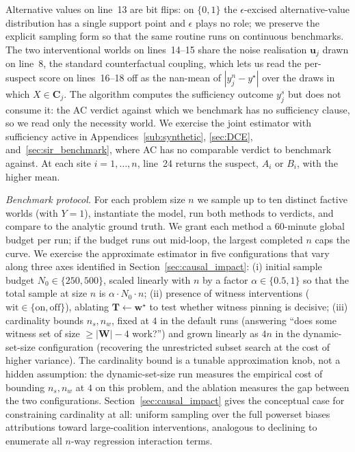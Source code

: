 Alternative values on line~13 are bit flips: on $\{0,1\}$ the
$\epsilon$-excised alternative-value distribution has a single support
point and $\epsilon$ plays no role; we preserve the explicit sampling form
so that the same routine runs on continuous benchmarks. The two
interventional worlds on lines~14--15 share the noise realisation
$\mathbf{u}_j$ drawn on line~8, the standard counterfactual coupling,
which lets us read the per-suspect score on lines~16--18 off as the
nan-mean of $|y^n_j - y^\star|$ over the draws in which
$X\in\mathbf{C}_j$. The algorithm computes the sufficiency outcome $y^s_j$ but does not
consume it: the AC verdict against which we benchmark has no sufficiency
clause, so we read only the necessity world. We exercise the joint estimator with
sufficiency active in Appendices~\ref{sub:synthetic}, \ref{sec:DCE}, and~\ref{sec:sir_benchmark}, where AC has no comparable
verdict to benchmark against. At each site
$i = 1,\dots,n$, line~24 returns the suspect, $A_i$ or $B_i$, with
the higher mean.

\medskip\noindent\textit{Benchmark protocol.}
For each problem size $n$ we sample up to ten distinct factive worlds (with
\(Y=1\)), instantiate the model, run both methods to verdicts, and compare to the
analytic ground truth. We grant each method a 60-minute global budget per run; if
the budget runs out mid-loop, the largest completed $n$ caps the curve. We exercise the
approximate estimator in five configurations that vary along three axes
identified in Section~\ref{sec:causal_impact}:
(i) initial sample budget $N_0\in\{250,500\}$, scaled linearly with $n$ by a factor
$\alpha\in\{0.5,1\}$ so that the total sample at size $n$ is $\alpha\cdot N_0\cdot n$;
(ii) presence of witness interventions ($\mathrm{wit}\in\{\text{on},\text{off}\}$),
ablating $\mathbf{T}\!\leftarrow\!\mathbf{w}^\star$ to test whether witness pinning is
decisive; (iii) cardinality bounds $n_s,n_w$, fixed at $4$ in the default runs
(answering ``does some witness set of size $\geq|\mathbf{W}|-4$ work?'') and grown
linearly as $4n$ in the dynamic-set-size configuration (recovering the unrestricted
subset search at the cost of higher variance). The cardinality bound is a tunable
approximation knob, not a hidden assumption: the dynamic-set-size run measures the
empirical cost of bounding $n_s,n_w$ at $4$ on this problem, and the ablation measures the gap between the two configurations. Section~\ref{sec:causal_impact} gives the conceptual case for
constraining cardinality at all: uniform sampling over the full powerset
biases attributions toward large-coalition interventions, analogous to
declining to enumerate all $n$-way regression interaction terms.

